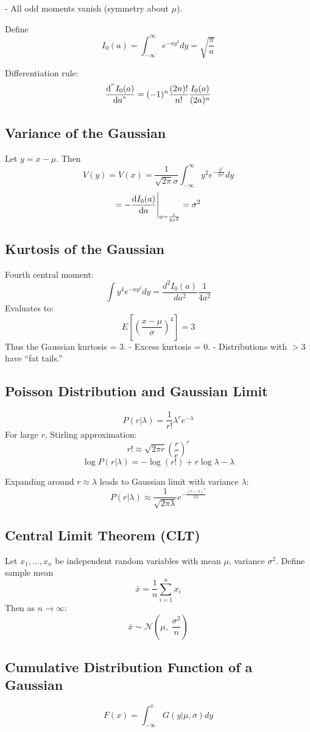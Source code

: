 - All odd moments vanish (symmetry about $\mu$).

Define
\[
    I_0(a) = \int_{-\infty}^{\infty} e^{-a y^2} dy = \sqrt{\frac{\pi}{a}}
\]

Differentiation rule:
\[
    \dv[^n]{I_0(a)}{a} = (-1)^n \frac{(2n)!}{n!} \frac{I_0(a)}{(2a)^n}
\]

\subsection{Variance of the Gaussian}
Let $y = x-\mu$. Then
\[
    V(y) = V(x) = \frac{1}{\sqrt{2 \pi}\sigma}
    \int_{-\infty}^{\infty} y^2 e^{-\frac{y^2}{2\sigma^2}} dy
\]
\[
    = -\dv{I_0(a)}{a}\Bigg|_{a=\frac{1}{2\sigma^2}} = \sigma^2
\]

\subsection{Kurtosis of the Gaussian}
Fourth central moment:
\[
    \int y^4 e^{-a y^2} dy = \frac{d^2 I_0(a)}{d a^2}\frac{1}{4 a^2}
\]
Evaluates to:
\[
    E\!\left[\left(\frac{x-\mu}{\sigma}\right)^4\right] = 3
\]
Thus the Gaussian kurtosis = 3.
- Excess kurtosis = 0.
- Distributions with $>3$ have “fat tails.”

\subsection{Poisson Distribution and Gaussian Limit}
\[
    P(r|\lambda) = \frac{1}{r!} \lambda^r e^{-\lambda}
\]
For large $r$, Stirling approximation:
\[
    r! \approx \sqrt{2 \pi r} \left(\frac{r}{e}\right)^r
\]
\[
    \log P(r|\lambda) = -\log(r!) + r\log\lambda - \lambda
\]

Expanding around $r \approx \lambda$ leads to Gaussian limit with variance $\lambda$:
\[
    P(r|\lambda) \approx
    \frac{1}{\sqrt{2 \pi \lambda}} e^{-\frac{(r-\lambda)^2}{2\lambda}}
\]

\subsection{Central Limit Theorem (CLT)}
Let $x_1,\dots,x_n$ be independent random variables with
mean $\mu$, variance $\sigma^2$. Define sample mean
\[
    \bar{x} = \frac{1}{n} \sum_{i=1}^n x_i
\]
Then as $n \to \infty$:
\[
    \bar{x} \sim \mathcal{N}\!\left(\mu,\; \frac{\sigma^2}{n}\right)
\]

\subsection{Cumulative Distribution Function of a Gaussian}
\[
    F(x) = \int_{-\infty}^x G(y|\mu,\sigma) dy
\]

